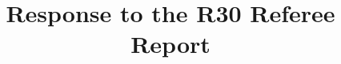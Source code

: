 
\begin{frontmatter}
\title{Response to the R30 Referee Report}
\begin{aug}\author[id=au1,addressref={add1}]{~}\address[id=add1]{}\end{aug}
\end{frontmatter}


